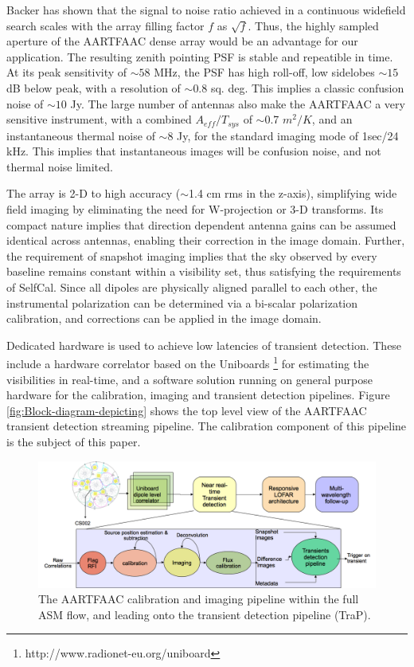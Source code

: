 \documentclass{aa}
\begin{document}
Backer \citep{backer1999pers} has shown that  the signal to noise ratio achieved
in a  continuous widefield search  scales with the  array filling factor  $f$ as
$\sqrt{f}$. Thus, the highly sampled  aperture of the AARTFAAC dense array would
be an advantage for our application. The resulting zenith pointing PSF is stable
and repeatible in  time. At its peak sensitivity of $\sim$$58$  MHz, the PSF has
high  roll-off, low sidelobes  $\sim$$15$ dB  below peak,  with a  resolution of
$\sim$$0.8$  sq.  deg.  This implies  a  classic confusion  noise of  $\sim$$10$
Jy.  The large  number  of antennas  also  make the  AARTFAAC  a very  sensitive
instrument,     with    a     combined     $A_{eff}/T_{sys}$    of     $\sim$0.7
$m^{2}/K$\citep{wijnholds2011situ},  and  an   instantaneous  thermal  noise  of
$\sim$8 Jy,  for the standard  imaging mode of  1sec/24 kHz.  This  implies that
instantaneous images will be confusion noise, and not thermal noise limited.

The array is 2-D to high  accuracy ($\sim$1.4 cm rms in the z-axis), simplifying
wide field imaging  by eliminating the need for  W-projection or 3-D transforms.
Its compact nature implies that direction dependent antenna gains can be assumed
identical  across  antennas, enabling  their  correction  in  the image  domain.
Further, the  requirement of snapshot imaging  implies that the  sky observed by
every baseline  remains constant  within a visibility  set, thus  satisfying the
requirements of  SelfCal. Since all  dipoles are physically aligned  parallel to
each  other, the  instrumental polarization  can be  determined via  a bi-scalar
polarization calibration, and corrections can be applied in the image domain.

Dedicated  hardware is  used to  achieve low  latencies of  transient detection.
These      include     a      hardware     correlator      based      on     the
Uniboards  \footnote{http://www.radionet-eu.org/uniboard}   for  estimating  the
visibilities in  real-time, and a  software solution running on  general purpose
hardware for the calibration, imaging and transient detection pipelines.  Figure
\ref{fig:Block-diagram-depicting}  shows  the top  level  view  of the  AARTFAAC
transient  detection  streaming pipeline.   The  calibration  component of  this
pipeline is the subject of this paper.

\begin{figure}[tbh]
\centering
\includegraphics[width=1\textwidth]{Figs/AFAAC_blkdia_latest.png}
\caption{\label{fig:The-AARTFAAC-calibration}The    AARTFAAC   calibration   and
  imaging  pipeline within the  full ASM  flow, and  leading onto  the transient
  detection pipeline (TraP).}
\end{figure}
\end{document}
